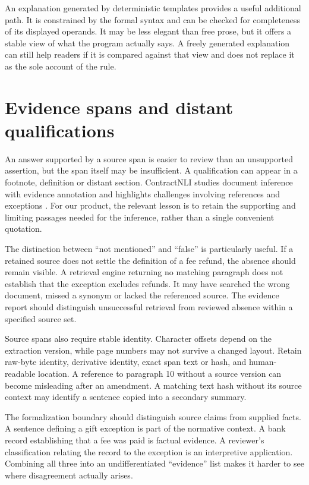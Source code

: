 An explanation generated by deterministic templates provides a useful
additional path. It is constrained by the formal syntax and can be checked
for completeness of its displayed operands. It may be less elegant than
free prose, but it offers a stable view of what the program actually says.
A freely generated explanation can still help readers if it is compared
against that view and does not replace it as the sole account of the rule.

\section{Evidence spans and distant qualifications}
\label{merge:M04:12}

\label{sec:languages-evidence}
An answer supported by a source span is easier to review than an unsupported
assertion, but the span itself may be insufficient. A qualification can appear
in a footnote, definition or distant section. ContractNLI studies document
inference with evidence annotation and highlights challenges involving
references and exceptions \citep[task, annotation and error-analysis sections]{contractnli2021}.
For our product, the relevant lesson is to retain the supporting and limiting
passages needed for the inference, rather than a single convenient quotation.

The distinction between ``not mentioned'' and ``false'' is particularly useful.
If a retained source does not settle the definition of a fee refund, the
absence should remain visible. A retrieval engine returning no matching
paragraph does not establish that the exception excludes refunds. It may have
searched the wrong document, missed a synonym or lacked the referenced source.
The evidence report should distinguish unsuccessful retrieval from reviewed
absence within a specified source set.


Source spans also require stable identity. Character offsets depend on the
extraction version, while page numbers may not survive a changed layout.
Retain raw-byte identity, derivative identity, exact span text or hash, and
human-readable location. A reference to paragraph 10 without a source version
can become misleading after an amendment. A matching text hash without its
source context may identify a sentence copied into a secondary summary.

The formalization boundary should distinguish source claims from supplied
facts. A sentence defining a gift exception is part of the normative context.
A bank record establishing that a fee was paid is factual evidence. A
reviewer's classification relating the record to the exception is an
interpretive application. Combining all three into an undifferentiated
``evidence'' list makes it harder to see where disagreement actually arises.

